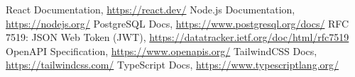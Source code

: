 \begin{thebibliography}{99}

 React Documentation, \url{https://react.dev/}
 Node.js Documentation, \url{https://nodejs.org/}
 PostgreSQL Docs, \url{https://www.postgresql.org/docs/}
 RFC 7519: JSON Web Token (JWT), \url{https://datatracker.ietf.org/doc/html/rfc7519}
 OpenAPI Specification, \url{https://www.openapis.org/}
 TailwindCSS Docs, \url{https://tailwindcss.com/}
 TypeScript Docs, \url{https://www.typescriptlang.org/}

\end{thebibliography}
